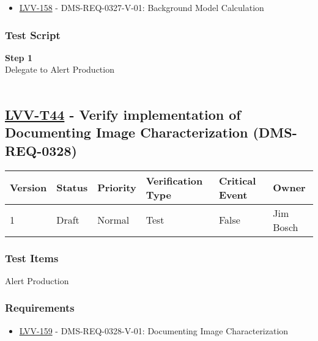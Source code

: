 \begin{itemize}
\tightlist
\item
  \href{https://jira.lsstcorp.org/browse/LVV-158}{LVV-158} -
  DMS-REQ-0327-V-01: Background Model Calculation
\end{itemize}

\hypertarget{test-script-20}{%
\subsubsection{Test Script}\label{test-script-20}}

\textbf{Step 1}\\
Delegate to Alert Production\\
~\\

\hypertarget{lvv-t44---verify-implementation-of-documenting-image-characterization-dms-req-0328}{%
\subsection{\texorpdfstring{\href{https://jira.lsstcorp.org/secure/Tests.jspa\#/testCase/LVV-T44}{LVV-T44}
- Verify implementation of Documenting Image Characterization
(DMS-REQ-0328)}{LVV-T44 - Verify implementation of Documenting Image Characterization (DMS-REQ-0328)}}\label{lvv-t44---verify-implementation-of-documenting-image-characterization-dms-req-0328}}

\begin{longtable}[]{@{}llllll@{}}
\toprule
Version & Status & Priority & Verification Type & Critical Event &
Owner\tabularnewline
\midrule
\endhead
1 & Draft & Normal & Test & False & Jim Bosch\tabularnewline
\bottomrule
\end{longtable}

\hypertarget{test-items-20}{%
\subsubsection{Test Items}\label{test-items-20}}

Alert Production~

\hypertarget{requirements-21}{%
\subsubsection{Requirements}\label{requirements-21}}

\begin{itemize}
\tightlist
\item
  \href{https://jira.lsstcorp.org/browse/LVV-159}{LVV-159} -
  DMS-REQ-0328-V-01: Documenting Image Characterization
\end{itemize}

